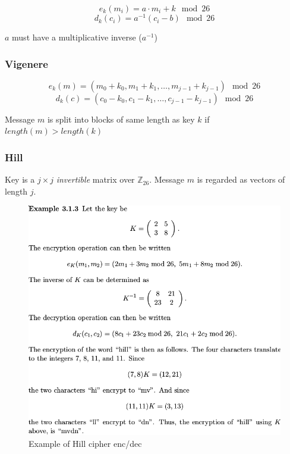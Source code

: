 \[ e_k(m_i) = a \cdot m_i + k \mod 26 \]
\[ d_k(c_i) = a^{-1}(c_i - b) \mod 26 \]

$a$ must have a multiplicative inverse ($a^{-1}$)

\subsubsection{Vigenere}
\[ e_k (m) = (m_0 + k_0, m_1 + k_1, \ldots, m_{j-1} + k_{j-1} ) \mod 26 \]
\[ d_k (c) = (c_0 - k_0 , c_1 - k_1 , \ldots, c_{j-1} - k_{j-1} ) \mod 26 \]

Message $m$ is split into blocks of same length as key $k$ if $length(m) > length(k)$

\subsubsection{Hill}
Key is a $j \times j$ \emph{invertible} matrix over $\mathbb{Z}_{26}$. Message $m$ is regarded as vectors of length $j$.

\begin{figure}[H]
\centering
\includegraphics[scale=0.3]{images/1-hill.png}
\caption{Example of Hill cipher enc/dec}
\end{figure}
